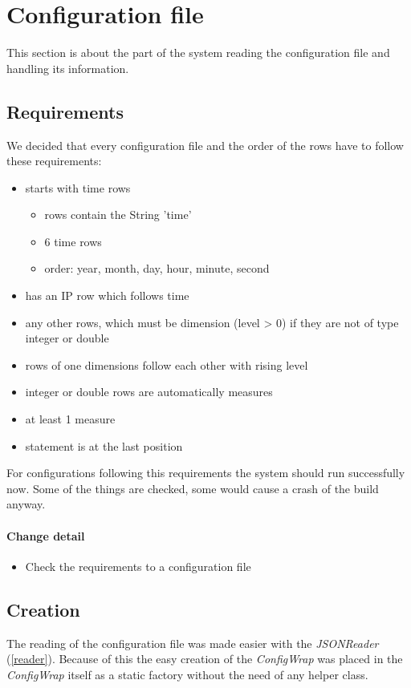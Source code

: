 \section{Configuration file}
This section is about the part of the system reading the configuration file
and handling its information.

\subsection{Requirements}
We decided that every configuration file and the order of the 
rows have to follow these requirements:
\begin{itemize}
  \item starts with time rows
  \begin{itemize}
    \item rows contain the String 'time'
    \item 6 time rows
    \item order: year, month, day, hour, minute, second 
  \end{itemize}
  \item has an IP row which follows time
  \item any other rows, which must be dimension (level > 0) if they are not of
  type integer or double
  \item rows of one dimensions follow each other with rising level
  \item integer or double rows are automatically measures
  \item at least 1 measure
  \item statement is at the last position
\end{itemize} 

For configurations following this requirements the system should run
successfully now. Some of the things are checked, some would cause a crash
of the build anyway. %

\paragraph{Change detail}
\begin{itemize}
  \item Check the requirements to a configuration file
\end{itemize}

\subsection{Creation}
The reading of the configuration file was made easier with the
\textit{JSONReader} (\ref{reader}). Because of this the easy creation
of the \textit{ConfigWrap} was placed in the \textit{ConfigWrap} itself as
a static factory without the need of any helper class.

